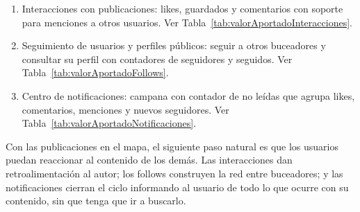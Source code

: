\begin{enumerate}
\item Interacciones con publicaciones: likes, guardados y comentarios con soporte para menciones a otros usuarios. Ver Tabla~\ref{tab:valorAportadoInteracciones}.
\item Seguimiento de usuarios y perfiles públicos: seguir a otros buceadores y consultar su perfil con contadores de seguidores y seguidos. Ver Tabla~\ref{tab:valorAportadoFollows}.
\item Centro de notificaciones: campana con contador de no leídas que agrupa likes, comentarios, menciones y nuevos seguidores. Ver Tabla~\ref{tab:valorAportadoNotificaciones}.
\end{enumerate}
Con las publicaciones en el mapa, el siguiente paso natural es que los usuarios puedan reaccionar al contenido de los demás. Las interacciones dan retroalimentación al autor; los follows construyen la red entre buceadores; y las notificaciones cierran el ciclo informando al usuario de todo lo que ocurre con su contenido, sin que tenga que ir a buscarlo.

